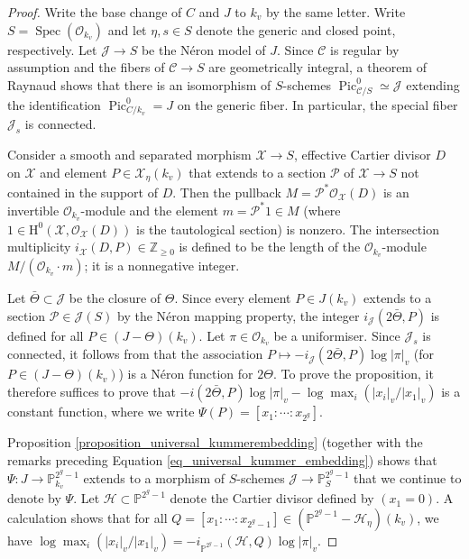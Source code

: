 \documentclass{article} %
\numberwithin{equation}{section}
\DeclareMathOperator{\Spec}{Spec}
\DeclareMathOperator{\Pic}{Pic}
\newcommand{\sh}[1]{\mathscr{#1}}
\renewcommand{\P}{\mathbb{P}}
\renewcommand{\O}{\mathcal{O}}
\newcommand{\HH}{\mathrm{H}}
\newcommand{\Z}{\mathbb{Z}}
\begin{document}
\begin{proof}
    Write the base change of $C$ and $J$ to $k_v$ by the same letter.
    Write $S = \Spec(\O_{k_v})$ and let $\eta, s\in S$ denote the generic and closed point, respectively.
    Let $\sh{J}\rightarrow S$ be the N\'eron model of $J$.
    Since $\mathcal{C}$ is regular by assumption and the fibers of $\mathcal{C}\rightarrow S$ are geometrically integral, a theorem of Raynaud \cite[\S9.5, Theorem 1]{BLR-neronmodels} shows that there is an isomorphism of $S$-schemes $\Pic_{\mathcal{C}/S}^0 \simeq \sh{J}$ extending the identification $\Pic_{C/k_v}^0  = J$ on the generic fiber.
    In particular, the special fiber $\sh{J}_s$ is connected.

    Consider a smooth and separated morphism $\mathcal{X}\rightarrow S$, effective Cartier divisor $D$ on $\mathcal{X}$ and element $P \in \mathcal{X}_{\eta}(k_v)$ that extends to a section $\mathcal{P}$ of $\mathcal{X}\rightarrow S$ not contained in the support of $D$.
    Then the pullback $M = \mathcal{P}^*\O_{\mathcal{X}}(D)$ is an invertible $\O_{k_v}$-module and the element $m = \mathcal{P}^*1 \in M$ (where $1\in \HH^0(\mathcal{X}, \O_{\mathcal{X}}(D))$ is the tautological section) is nonzero.
    The intersection multiplicity $i_{\mathcal{X}}(D,P)\in \Z_{\geq 0}$ is defined to be the length of the $\O_{k_v}$-module $M/(\O_{k_v}\cdot m)$; it is a nonnegative integer.

    Let $\bar{\Theta}\subset \sh{J}$ be the closure of $\Theta$. 
    Since every element $P\in J(k_v)$ extends to a section $\mathcal{P} \in \sh{J}(S)$ by the N\'eron mapping property, the integer $i_{\sh{J}}(2\bar{\Theta},P)$ is defined for all $P\in (J-\Theta)(k_v)$.
    Let $\pi\in \O_{k_v}$ be a uniformiser. 
    Since $\sh{J}_s$ is connected, it follows from \cite[Ch. 11, Theorem 5.1]{Lan83} that the association $P\mapsto -i_{\sh{J}}(2\bar{\Theta}, P)\log |\pi|_v$ (for $P\in (J-\Theta)(k_v)$) is a N\'eron function for $2\Theta$.
    To prove the proposition, it therefore suffices to prove that $-i(2\bar{\Theta},P)\log |\pi|_v - \log\max_i(|x_i|_v/|x_1|_v)$ is a constant function, where we write $\Psi(P) = [x_1 : \cdots : x_{2^g}]$.

    Proposition \ref{proposition_universal_kummerembedding} (together with the remarks preceding Equation \eqref{eq_universal_kummer_embedding}) shows that $\Psi\colon J \rightarrow \P^{2^g-1}_{k_v}$ extends to a morphism of $S$-schemes $\sh{J} \rightarrow \P^{2^g-1}_S$
    that we continue to denote by $\Psi$. 
    Let $\mathcal{H}\subset \P^{2^g-1}$ denote the Cartier divisor defined by $(x_1 = 0)$.
    A calculation shows that for all $Q = [x_1: \cdots: x_{2^g-1}]\in (\P^{2^g-1}-\mathcal{H}_{\eta})(k_v)$, we have $\log \max_i(|x_i|_v/|x_1|_v) = - i_{\P^{2^g-1}}(\mathcal{H},Q) \log |\pi|_v$.


\end{proof}
\end{document}
